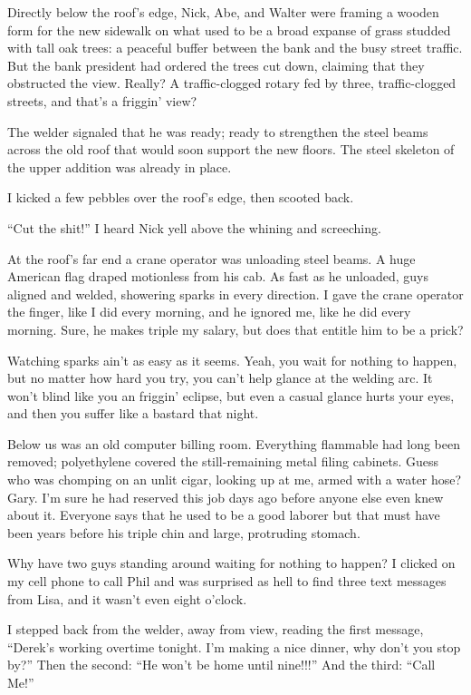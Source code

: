 Directly below the roof's edge, Nick, Abe, and Walter were framing a
wooden form for the new sidewalk on what used to be a broad expanse of
grass studded with tall oak trees: a peaceful buffer between the bank
and the busy street traffic. But the bank president had ordered the
trees cut down, claiming that they obstructed the view. Really? A
traffic-clogged rotary fed by three, traffic-clogged streets, and that's
a friggin' view?

The welder signaled that he was ready; ready to strengthen the steel
beams across the old roof that would soon support the new floors. The
steel skeleton of the upper addition was already in place.

I kicked a few pebbles over the roof's edge, then scooted back. ~~~

``Cut the shit!'' I heard Nick yell above the whining and screeching.
~~~

At the roof's far end a crane operator was unloading steel beams. A huge
American flag draped motionless from his cab. As fast as he unloaded,
guys aligned and welded, showering sparks in every direction. I gave the
crane operator the finger, like I did every morning, and he ignored me,
like he did every morning. Sure, he makes triple my salary, but does
that entitle him to be a prick?

Watching sparks ain't as easy as it seems. Yeah, you wait for nothing to
happen, but no matter how hard you try, you can't help glance at the
welding arc. It won't blind like you an friggin' eclipse, but even a
casual glance hurts your eyes, and then you suffer like a bastard that
night. ~

Below us was an old computer billing room. Everything flammable had long
been removed; polyethylene covered the still-remaining metal filing
cabinets. Guess who was chomping on an unlit cigar, looking up at me,
armed with a water hose? Gary. I'm sure he had reserved this job days
ago before anyone else even knew about it. Everyone says that he used to
be a good laborer but that must have been years before his triple chin
and large, protruding stomach.

Why have two guys standing around waiting for nothing to happen? I
clicked on my cell phone to call Phil and was surprised as hell to find
three text messages from Lisa, and it wasn't even eight o'clock.

I stepped back from the welder, away from view, reading the first
message, ``Derek's working overtime tonight. I'm making a nice dinner,
why don't you stop by?'' Then the second: ``He won't be home until
nine!!!'' And the third: ``Call Me!'' ~

